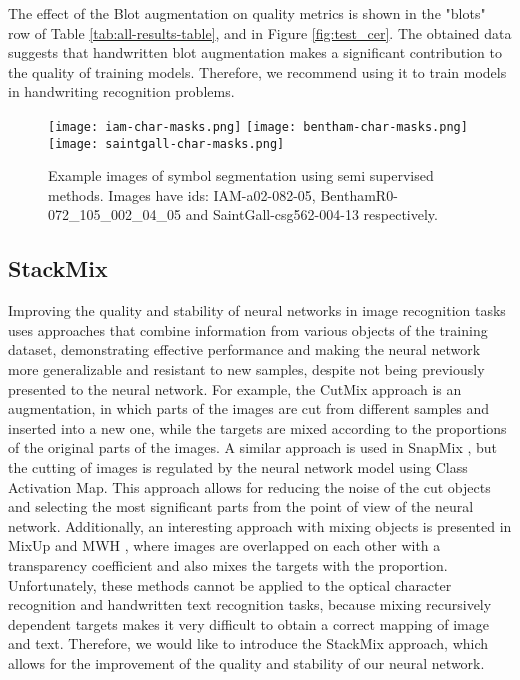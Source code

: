 \documentclass[10pt,twocolumn,letterpaper]{article}
\begin{document}
The effect of the Blot augmentation on quality metrics is shown in the "blots" row of Table \ref{tab:all-results-table}, and in Figure \ref{fig:test_cer}. The obtained data suggests that handwritten blot augmentation makes a significant contribution to the quality of training models. Therefore, we recommend using it to train models in handwriting recognition problems.

\begin{figure*}
\begin{center}
\texttt{[image: iam-char-masks.png]}
    \label{fig:example1}
    \texttt{[image: bentham-char-masks.png]}
    \label{fig:example2}
    \texttt{[image: saintgall-char-masks.png]}
    \label{fig:example3}
\end{center}
   \caption{Example images of symbol segmentation using semi supervised methods. Images have ids: IAM-a02-082-05, BenthamR0-072\_105\_002\_04\_05 and SaintGall-csg562-004-13 respectively.}
\label{fig:char-masks-examples}
\end{figure*}

\subsection{StackMix}
Improving the quality and stability of neural networks in image recognition tasks uses approaches that combine information from various objects of the training dataset, demonstrating effective performance and making the neural network more generalizable and resistant to new samples, despite not being previously presented to the neural network. For example, the CutMix approach \cite{yun2019cutmix} is an augmentation, in which parts of the images are cut from different samples and inserted into a new one, while the targets are mixed according to the proportions of the original parts of the images. A similar approach is used in SnapMix \cite{huang2020snapmix}, but the cutting of images is regulated by the neural network model using Class Activation Map. This approach allows for reducing the noise of the cut objects and selecting the most significant parts from the point of view of the neural network. Additionally, an interesting approach with mixing objects is presented in MixUp \cite{zhang2018mixup} and MWH \cite{yu2021mixup}, where images are overlapped on each other with a transparency coefficient and also mixes the targets with the proportion. Unfortunately, these methods cannot be applied to the optical character recognition and handwritten text recognition tasks, because mixing recursively dependent targets makes it very difficult to obtain a correct mapping of image and text. Therefore, we would like to introduce the StackMix approach, which allows for the improvement of the quality and stability of our neural network.
\end{document}
